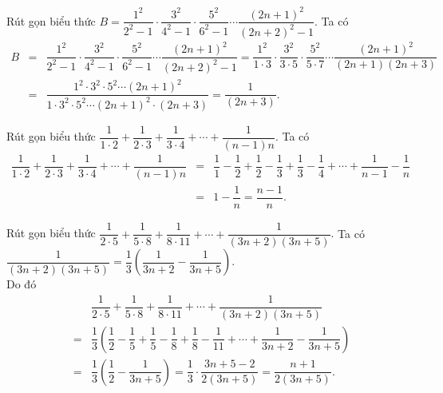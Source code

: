 \begin{bt}%
 Rút gọn biểu thức $B=\dfrac{1^2}{2^2-1} \cdot \dfrac{3^2}{4^2-1} \cdot \dfrac{5^2}{6^2-1} \cdots \dfrac{(2n+1)^2}{(2n+2)^2-1}$.
  \loigiai
  {
  Ta có
  \allowdisplaybreaks
  \begin{eqnarray*}
   B &=& \dfrac{1^2}{2^2-1} \cdot \dfrac{3^2}{4^2-1} \cdot \dfrac{5^2}{6^2-1} \cdots \dfrac{(2n+1)^2}{(2n+2)^2-1}
   = \dfrac{1^2}{1 \cdot 3} \cdot \dfrac{3^2}{3 \cdot 5} \cdot \dfrac{5^2}{5 \cdot 7} \cdots \dfrac{(2n+1)^2}{(2n+1)(2n+3)}\\
   &=& \dfrac{1^2 \cdot 3^2 \cdot 5^2 \cdots (2n+1)^2}{1 \cdot 3^2 \cdot 5^2 \cdots (2n+1)^2 \cdot (2n+3)} = \dfrac{1}{(2n+3)}.
  \end{eqnarray*}
  }
\end{bt}

\begin{bt}%
 Rút gọn biểu thức $\dfrac{1}{1 \cdot 2} + \dfrac{1}{2 \cdot 3} + \dfrac{1}{3 \cdot 4} + \cdots + \dfrac{1}{(n-1)n}$.
 \loigiai
  {
  Ta có
  \allowdisplaybreaks
  \begin{eqnarray*}
   \dfrac{1}{1 \cdot 2} + \dfrac{1}{2 \cdot 3} + \dfrac{1}{3 \cdot 4} + \cdots + \dfrac{1}{(n-1)n}
   &=& \dfrac{1}{1}-\dfrac{1}{2} + \dfrac{1}{2}-\dfrac{1}{3} + \dfrac{1}{3}-\dfrac{1}{4} + \cdots + \dfrac{1}{n-1}-\dfrac{1}{n}\\
   &=& 1-\dfrac{1}{n} = \dfrac{n-1}{n}.
  \end{eqnarray*}
  }
\end{bt}

\begin{bt}%
 Rút gọn biểu thức $\dfrac{1}{2 \cdot 5} + \dfrac{1}{5 \cdot 8} + \dfrac{1}{8 \cdot 11} + \cdots + \dfrac{1}{(3n+2)(3n+5)}$.
 \loigiai
  {
  Ta có $\dfrac{1}{(3n+2)(3n+5)} = \dfrac{1}{3} \left(\dfrac{1}{3n+2}-\dfrac{1}{3n+5}\right)$.\\
  Do đó
  \begin{eqnarray*}
   & & \dfrac{1}{2 \cdot 5} + \dfrac{1}{5 \cdot 8} + \dfrac{1}{8 \cdot 11} + \cdots + \dfrac{1}{(3n+2)(3n+5)}\\
   &=& \dfrac{1}{3} \left(\dfrac{1}{2}-\dfrac{1}{5} + \dfrac{1}{5}-\dfrac{1}{8} + \dfrac{1}{8}-\dfrac{1}{11} + \cdots + \dfrac{1}{3n+2}-\dfrac{1}{3n+5}\right)\\
   &=& \dfrac{1}{3} \left(\dfrac{1}{2}-\dfrac{1}{3n+5}\right) = \dfrac{1}{3} \cdot \dfrac{3n+5-2}{2(3n+5)} = \dfrac{n+1}{2(3n+5)}.
  \end{eqnarray*}
  }
\end{bt}

